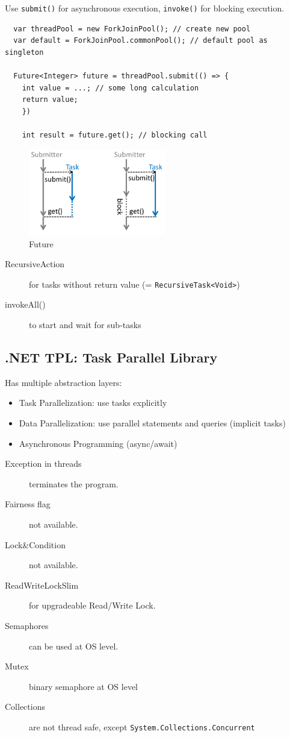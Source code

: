 Use \texttt{submit()} for asynchronous execution, \texttt{invoke()} for blocking execution.

\begin{lstlisting}
  var threadPool = new ForkJoinPool(); // create new pool
  var default = ForkJoinPool.commonPool(); // default pool as singleton
  
  Future<Integer> future = threadPool.submit(() => {
    int value = ...; // some long calculation
    return value;
    })

    int result = future.get(); // blocking call
  \end{lstlisting}
  
  \begin{figure}
    \centering
    \includegraphics[width=6cm]{res/05-future.png}
    \caption{Future}
  \end{figure}

  \begin{description}
    \item[RecursiveAction] for tasks without return value (= \texttt{RecursiveTask<Void>})
    \item[invokeAll()] to start and wait for sub-tasks
  \end{description}

\subsection{.NET TPL: Task Parallel Library}
Has multiple abstraction layers:
\begin{itemize}
  \item Task Parallelization: use tasks explicitly
  \item Data Parallelization: use parallel statements and queries (implicit tasks)
  \item Asynchronous Programming (async/await)
\end{itemize}

\begin{description}
  \item[Exception in threads] terminates the program.
  \item[Fairness flag] not available.
  \item[Lock\&Condition] not available.
  \item[ReadWriteLockSlim] for upgradeable Read/Write Lock.
  \item[Semaphores] can be used at OS level.
  \item[Mutex] binary semaphore at OS level
  \item[Collections] are not thread safe, except \texttt{System.Collections.Concurrent} 
\end{description}

